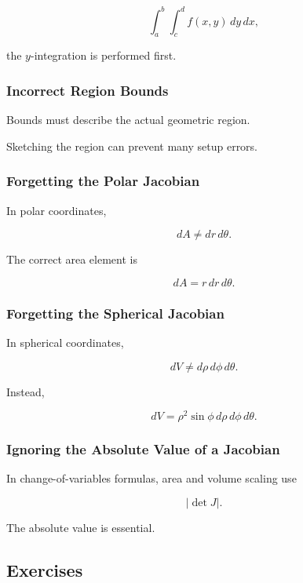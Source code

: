 \[ \int_a^b\int_c^d f(x,y)\,dy\,dx, \]

the \(y\)-integration is performed first.

\subsubsection{Incorrect Region Bounds}

Bounds must describe the actual geometric region.

Sketching the region can prevent many setup errors.

\subsubsection{Forgetting the Polar Jacobian}

In polar coordinates,

\[ dA\neq dr\,d\theta. \]

The correct area element is

\[ dA=r\,dr\,d\theta. \]

\subsubsection{Forgetting the Spherical Jacobian}

In spherical coordinates,

\[ dV\neq d\rho\,d\phi\,d\theta. \]

Instead,

\[ dV=\rho^2\sin\phi\,d\rho\,d\phi\,d\theta. \]

\subsubsection{Ignoring the Absolute Value of a Jacobian}

In change-of-variables formulas, area and volume scaling use

\[ \left|\det J\right|. \]

The absolute value is essential.

\subsection{Exercises}
\label{subsec:multivariable-exercises}

